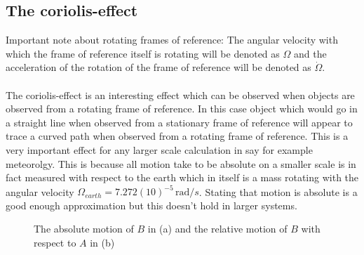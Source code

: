 \documentclass[11pt, a4paper]{article}
\newcommand*{\rad}{\ensuremath{\,\text{rad}}}
\begin{document}
\subsection{The coriolis-effect}
Important note about rotating frames of reference: The angular velocity with which the frame of reference itself is rotating will be denoted as $\Omega$ and the acceleration of the rotation of the frame of reference will be denoted as $\dot{\Omega}$.\\
\\
The coriolis-effect is an interesting effect which can be observed when objects are observed from a rotating frame of reference. In this case object which would go in a straight line when observed from a stationary frame of reference will appear to trace a curved path when observed from a rotating frame of reference. This is a very important effect for any larger scale calculation in say for example meteorolgy. This is because all motion take to be absolute on a smaller scale is in fact measured with respect to the earth which in itself is a mass rotating with the angular velocity $\Omega_{earth} = 7.272(10)^{-5} \rad/s$. Stating that motion is absolute is a good enough approximation but this doesn't hold in larger systems.
\begin{figure}[h]
  \centering
  \qquad \qquad \qquad
  \caption{The absolute motion of $B$ in (a) and the relative motion of $B$ with respect to $A$ in (b)}
\end{figure}
\end{document}
